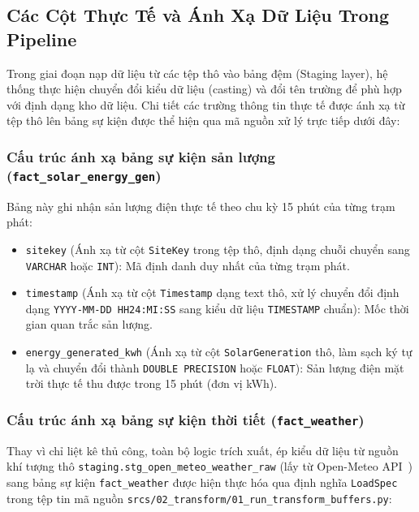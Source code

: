 \documentclass[12pt, a4paper]{report}
\begin{document}
\subsection{Các Cột Thực Tế và Ánh Xạ Dữ Liệu Trong Pipeline}
Trong giai đoạn nạp dữ liệu từ các tệp thô vào bảng đệm (Staging layer), hệ thống thực hiện chuyển đổi kiểu dữ liệu (casting) và đổi tên trường để phù hợp với định dạng kho dữ liệu. Chi tiết các trường thông tin thực tế được ánh xạ từ tệp thô lên bảng sự kiện được thể hiện qua mã nguồn xử lý trực tiếp dưới đây:

\subsubsection{Cấu trúc ánh xạ bảng sự kiện sản lượng (\texttt{fact\_solar\_energy\_gen})}
Bảng này ghi nhận sản lượng điện thực tế theo chu kỳ 15 phút của từng trạm phát:
\begin{itemize}
    \item \texttt{sitekey} (Ánh xạ từ cột \texttt{SiteKey} trong tệp thô, định dạng chuỗi chuyển sang \texttt{VARCHAR} hoặc \texttt{INT}): Mã định danh duy nhất của từng trạm phát.
    \item \texttt{timestamp} (Ánh xạ từ cột \texttt{Timestamp} dạng text thô, xử lý chuyển đổi định dạng \texttt{YYYY-MM-DD HH24:MI:SS} sang kiểu dữ liệu \texttt{TIMESTAMP} chuẩn): Mốc thời gian quan trắc sản lượng.
    \item \texttt{energy\_generated\_kwh} (Ánh xạ từ cột \texttt{SolarGeneration} thô, làm sạch ký tự lạ và chuyển đổi thành \texttt{DOUBLE PRECISION} hoặc \texttt{FLOAT}): Sản lượng điện mặt trời thực tế thu được trong 15 phút (đơn vị kWh).
\end{itemize}

\subsubsection{Cấu trúc ánh xạ bảng sự kiện thời tiết (\texttt{fact\_weather})}
Thay vì chỉ liệt kê thủ công, toàn bộ logic trích xuất, ép kiểu dữ liệu từ nguồn khí tượng thô \texttt{staging.stg\_open\_meteo\_weather\_raw} (lấy từ Open-Meteo API~\cite{openmeteo2023}) sang bảng sự kiện \texttt{fact\_weather} được hiện thực hóa qua định nghĩa \texttt{LoadSpec} trong tệp tin mã nguồn \texttt{srcs/02\_transform/01\_run\_transform\_buffers.py}:
\end{document}
